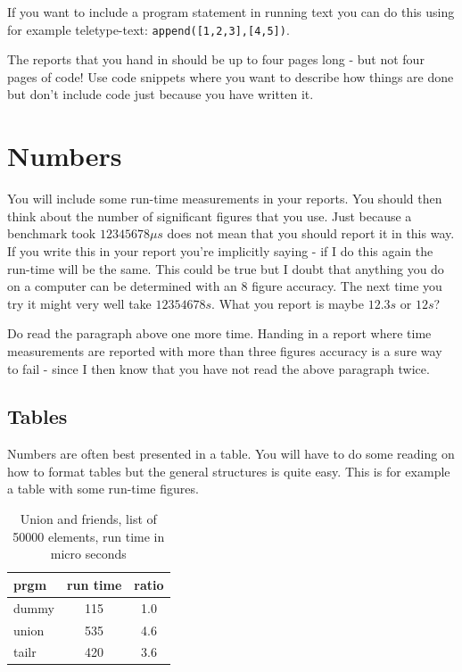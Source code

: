 \documentclass[a4paper,11pt]{article}
\begin{document}
If you want to include a program statement in running text you can do this
using for example teletype-text: {\tt append([1,2,3],[4,5])}.

The reports that you hand in should be up to four pages long - but not four
pages of code! Use code snippets where you want to describe how things
are done but don't include code just because you have written it. 

\section*{Numbers}

You will include some run-time measurements in your reports. You
should then think about the number of significant figures that you
use. Just because a benchmark took $12345678 \mu s$ does not mean that
you should report it in this way. If you write this in your report
you're implicitly saying - if I do this again the run-time will be the
same. This could be true but I doubt that anything you do on a
computer can be determined with an 8 figure accuracy. The next time
you try it might very well take $12354678 s$. What you report is
maybe $12.3 s$ or $12 s$?

Do read the paragraph above one more time. Handing in a report where
time measurements are reported with more than three figures accuracy is
a sure way to fail - since I then know that you have not read the
above paragraph twice.

\subsection*{Tables}

Numbers are often best presented in a table. You will have to do some
reading on how to format tables but the general structures is quite
easy. This is for example a table with some run-time figures.

\begin{table}[h]
\begin{center}
\begin{tabular}{l|c|c}
\textbf{prgm} & \textbf{run time} & \textbf{ratio}\\
\hline
  dummy      &  115 &     1.0\\
  union      &  535 &     4.6\\
  tailr      &  420 &     3.6\\
\end{tabular}
\caption{Union and friends, list of 50000 elements, run time in micro seconds}
\label{tab:table1}
\end{center}
\end{table}
\end{document}
